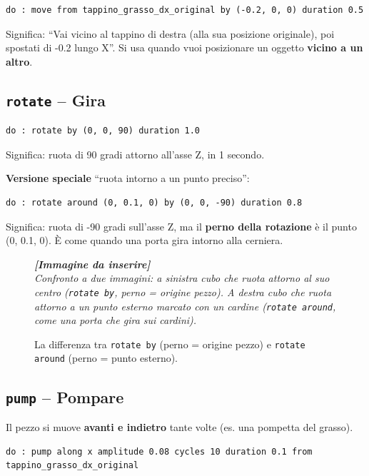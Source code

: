 ﻿\documentclass[a4paper,12pt,oneside]{book}
\newcommand{\imgph}[2]{%
  \begin{tcolorbox}[colback=cvtlightblue!30,colframe=cvtblue!40,%
    width=#1,halign=center,valign=center,height=5cm,boxrule=0.5pt,arc=3pt]%
    \textcolor{cvtgray}{\itshape\footnotesize\textbf{[Immagine da inserire]}\\[3pt]#2}%
  \end{tcolorbox}}
\begin{document}
\begin{lstlisting}
do : move from tappino_grasso_dx_original by (-0.2, 0, 0) duration 0.5
\end{lstlisting}

Significa: ``Vai vicino al tappino di destra (alla sua posizione originale),
poi spostati di -0.2 lungo X''. Si usa quando vuoi posizionare un oggetto
\textbf{vicino a un altro}.

\subsection{\texttt{rotate} -- Gira}

\begin{lstlisting}
do : rotate by (0, 0, 90) duration 1.0
\end{lstlisting}

Significa: ruota di 90 gradi attorno all'asse Z, in 1 secondo.

\textbf{Versione speciale} ``ruota intorno a un punto preciso'':

\begin{lstlisting}
do : rotate around (0, 0.1, 0) by (0, 0, -90) duration 0.8
\end{lstlisting}

Significa: ruota di -90 gradi sull'asse Z, ma il \textbf{perno della rotazione}
è il punto (0, 0.1, 0). È come quando una porta gira intorno alla cerniera.

\begin{figure}[H]
  \centering
  \imgph{12cm}{Confronto a due immagini: a sinistra cubo che ruota attorno al suo centro (\texttt{rotate by}, perno = origine pezzo). A destra cubo che ruota attorno a un punto esterno marcato con un cardine (\texttt{rotate around}, come una porta che gira sui cardini).}
  \caption{La differenza tra \texttt{rotate by} (perno = origine pezzo) e \texttt{rotate around} (perno = punto esterno).}
  \label{fig:rotate-due-modi}
\end{figure}

\subsection{\texttt{pump} -- Pompare}

Il pezzo si muove \textbf{avanti e indietro} tante volte (es. una pompetta del grasso).

\begin{lstlisting}
do : pump along x amplitude 0.08 cycles 10 duration 0.1 from tappino_grasso_dx_original
\end{lstlisting}
\end{document}
